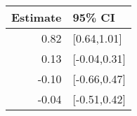 \begin{tabular}{rl}
  \hline
Estimate & 95\% CI \\ 
  \hline
0.82 & [0.64,1.01] \\ 
  0.13 & [-0.04,0.31] \\ 
  -0.10 & [-0.66,0.47] \\ 
  -0.04 & [-0.51,0.42] \\ 
   \hline
\end{tabular}


